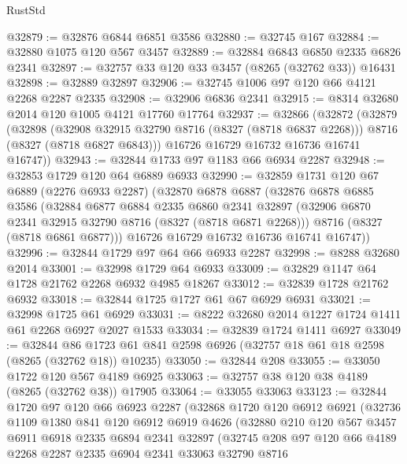 \begin{lexlean}{RustStd}
\begin{coremodule}
@32879 := @32876 @6844 @6851 @3586
@32880 := @32745 @167
@32884 := @32880 @1075 @120 @567 @3457
@32889 := @32884 @6843 @6850 @2335 @6826 @2341
@32897 := @32757 @33 @120 @33 @3457 (@8265 (@32762 @33)) @16431
@32898 := @32889 @32897
@32906 := @32745 @1006 @97 @120 @66 @4121 @2268 @2287 @2335
@32908 := @32906 @6836 @2341
@32915 := @8314 @32680 @2014 @120 @1005 @4121 @17760 @17764
@32937 := @32866
    (@32872
      (@32879
        (@32898
          (@32908 @32915 @32790 @8716 (@8327 (@8718 @6837 @2268)))
          @8716
          (@8327 (@8718 @6827 @6843)))
        @16726
        @16729
        @16732
        @16736
        @16741
        @16747))
@32943 := @32844 @1733 @97 @1183 @66 @6934 @2287
@32948 := @32853 @1729 @120 @64 @6889 @6933
@32990 := @32859
    @1731
    @120
    @67
    @6889
    (@2276 @6933 @2287)
    (@32870
      @6878
      @6887
      (@32876
        @6878
        @6885
        @3586
        (@32884
          @6877
          @6884
          @2335
          @6860
          @2341
          @32897
          (@32906 @6870 @2341 @32915 @32790 @8716 (@8327 (@8718 @6871 @2268)))
          @8716
          (@8327 (@8718 @6861 @6877)))
        @16726
        @16729
        @16732
        @16736
        @16741
        @16747))
@32996 := @32844 @1729 @97 @64 @66 @6933 @2287
@32998 := @8288 @32680 @2014
@33001 := @32998 @1729 @64 @6933
@33009 := @32829 @1147 @64 @1728 @21762 @2268 @6932 @4985 @18267
@33012 := @32839 @1728 @21762 @6932
@33018 := @32844 @1725 @1727 @61 @67 @6929 @6931
@33021 := @32998 @1725 @61 @6929
@33031 := @8222 @32680 @2014 @1227 @1724 @1411 @61 @2268 @6927 @2027 @1533
@33034 := @32839 @1724 @1411 @6927
@33049 := @32844
    @86
    @1723
    @61
    @841
    @2598
    @6926
    (@32757 @18 @61 @18 @2598 (@8265 (@32762 @18)) @10235)
@33050 := @32844 @208
@33055 := @33050 @1722 @120 @567 @4189 @6925
@33063 := @32757 @38 @120 @38 @4189 (@8265 (@32762 @38)) @17905
@33064 := @33055 @33063
@33123 := @32844
    @1720
    @97
    @120
    @66
    @6923
    @2287
    (@32868
      @1720
      @120
      @6912
      @6921
      (@32736
        @1109
        @1380
        @841
        @120
        @6912
        @6919
        @4626
        (@32880
          @210
          @120
          @567
          @3457
          @6911
          @6918
          @2335
          @6894
          @2341
          @32897
          (@32745
            @208
            @97
            @120
            @66
            @4189
            @2268
            @2287
            @2335
            @6904
            @2341
            @33063
            @32790
            @8716

\end{coremodule}
\end{lexlean}
